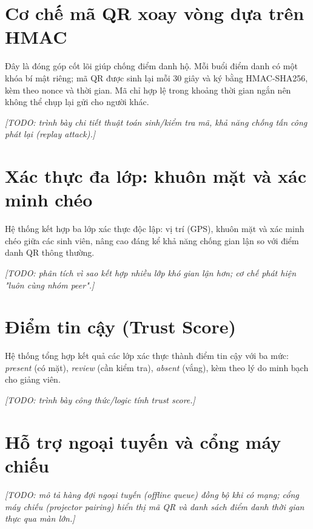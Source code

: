 \documentclass[../main.tex]{subfiles}
\begin{document}
\section{Cơ chế mã QR xoay vòng dựa trên HMAC}
Đây là đóng góp cốt lõi giúp chống điểm danh hộ. Mỗi buổi điểm danh có một khóa bí mật riêng; mã QR được sinh lại mỗi 30 giây và ký bằng HMAC-SHA256, kèm theo nonce và thời gian. Mã chỉ hợp lệ trong khoảng thời gian ngắn nên không thể chụp lại gửi cho người khác.

\textit{[TODO: trình bày chi tiết thuật toán sinh/kiểm tra mã, khả năng chống tấn công phát lại (replay attack).]}

\section{Xác thực đa lớp: khuôn mặt và xác minh chéo}
Hệ thống kết hợp ba lớp xác thực độc lập: vị trí (GPS), khuôn mặt và xác minh chéo giữa các sinh viên, nâng cao đáng kể khả năng chống gian lận so với điểm danh QR thông thường.

\textit{[TODO: phân tích vì sao kết hợp nhiều lớp khó gian lận hơn; cơ chế phát hiện "luôn cùng nhóm peer".]}

\section{Điểm tin cậy (Trust Score)}
Hệ thống tổng hợp kết quả các lớp xác thực thành điểm tin cậy với ba mức: \textit{present} (có mặt), \textit{review} (cần kiểm tra), \textit{absent} (vắng), kèm theo lý do minh bạch cho giảng viên.

\textit{[TODO: trình bày công thức/logic tính trust score.]}

\section{Hỗ trợ ngoại tuyến và cổng máy chiếu}
\textit{[TODO: mô tả hàng đợi ngoại tuyến (offline queue) đồng bộ khi có mạng; cổng máy chiếu (projector pairing) hiển thị mã QR và danh sách điểm danh thời gian thực qua màn lớn.]}
\end{document}
